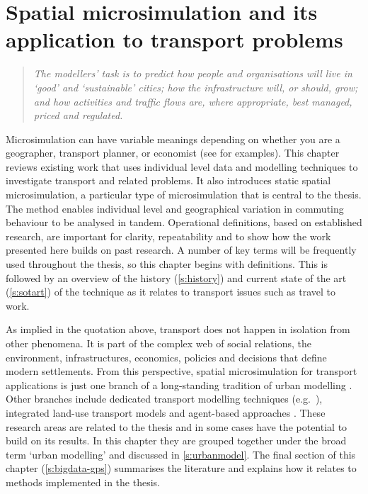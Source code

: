 
\chapter{Spatial microsimulation and its application to transport problems}
\label{Chapter3}
\fancyhead[RE,LO]{\thepage}

\begin{quote}
\textit{The modellers' task is to predict how people and organisations will live
in
`good' and `sustainable' cities; how the infrastructure will, or should, grow;
and how activities and traffic flows are, where appropriate, best managed,
priced and regulated.}
\end{quote}

Microsimulation can have variable meanings depending on whether you are a
geographer, transport planner, or economist
(see \citealp{Ballas2005b, Liu2006, Bourguignon2006} for examples).
This chapter reviews existing work that uses individual level data and modelling
techniques to investigate transport and related problems.
It also introduces static spatial microsimulation, a particular type of
microsimulation that is central to the thesis. The method enables
individual level and geographical variation in commuting behaviour
to be analysed in tandem. Operational definitions, based on
established research, are important for clarity, repeatability and to
show how the work presented here builds on past research. A number of key terms will be
frequently used throughout the thesis, so this chapter begins with
definitions.
This is followed by an overview of the history (\cref{s:history}) and current
state of the art (\cref{s:sotart}) of the technique as it relates to transport
issues such as travel to work.

As implied in the quotation above, transport does not happen in isolation from
other phenomena. It is part of the complex web of social relations, the environment,
infrastructures, economics, policies and decisions
that define modern settlements. From this
perspective, spatial microsimulation for transport applications is just one
branch of a long-standing tradition of urban modelling
\citep{Wilson1970, batty1976urban, batty2007cities}.
Other branches include dedicated transport modelling techniques
(e.g.~\citealp{SATURN2012}), integrated land-use transport  models
\citep{Wegener2009} and agent-based approaches \citep{Gilbert2008-abm}.
These research areas are related to the thesis and in some cases have
the potential to build on its results. In this chapter they
are grouped together under the broad term `urban modelling' and
discussed in \cref{s:urbanmodel}. The final section of
this chapter (\cref{s:bigdata-gps}) summarises the literature and
explains how it relates to methods implemented in the thesis.

